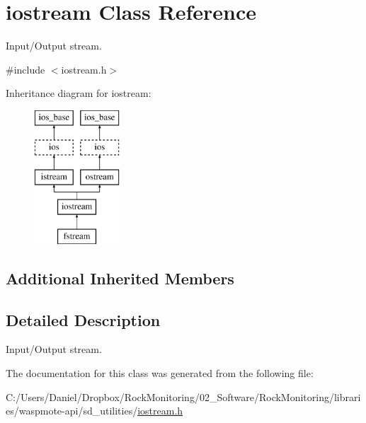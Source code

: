 \hypertarget{classiostream}{}\section{iostream Class Reference}
\label{classiostream}


Input/\+Output stream.  




{\ttfamily \#include $<$iostream.\+h$>$}

Inheritance diagram for iostream\+:\begin{figure}[H]
\begin{center}
\leavevmode
\includegraphics[height=5.000000cm]{classiostream}
\end{center}
\end{figure}
\subsection*{Additional Inherited Members}


\subsection{Detailed Description}
Input/\+Output stream. 

The documentation for this class was generated from the following file\+:\begin{DoxyCompactItemize}
\item 
C\+:/\+Users/\+Daniel/\+Dropbox/\+Rock\+Monitoring/02\+\_\+\+Software/\+Rock\+Monitoring/libraries/waspmote-\/api/sd\+\_\+utilities/\hyperlink{iostream_8h}{iostream.\+h}\end{DoxyCompactItemize}
